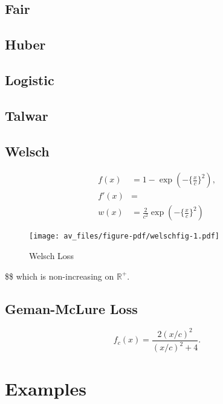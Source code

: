 \documentclass[
  12pt,
  letterpaper,
  DIV=11,
  numbers=noendperiod]{scrartcl}
\newcommand{\sectionbreak}{\pagebreak}
\theoremstyle{plain}
\theoremstyle{remark}
\begin{document}
\subsection{Fair}\label{fair}

\subsection{Huber}\label{huber}

\subsection{Logistic}\label{logistic}

\subsection{Talwar}\label{talwar}

\subsection{Welsch}\label{welsch}

\begin{align}
f(x)&=1-\exp(-\{\frac{x}{c}\}^2),\\
f'(x)&=\\
w(x)&=\frac{2}{c^2}\exp(-\{\frac{x}{c}\}^2)
\end{align}

\begin{figure}[H]

{\centering \texttt{[image: av\_files/figure-pdf/welschfig-1.pdf]}

}

\caption{Welsch Loss}

\end{figure}%

\$\$ which is non-increasing on \(\mathbb{R}^+\).

\subsection{Geman-McLure Loss}\label{geman-mclure-loss}

\[
f_c(x)=\frac{2(x/c)^2}{(x/c)^2+4}.
\]

\sectionbreak

\section{Examples}\label{examples}
\end{document}
